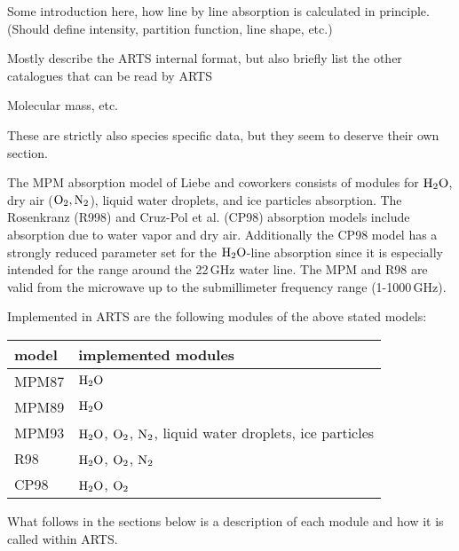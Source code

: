 Some introduction here, how line by line absorption is calculated in
principle. (Should define intensity, partition function, line shape, etc.)


Mostly describe the ARTS internal format, but also briefly list the
other catalogues that can be read by ARTS


Molecular mass, etc. 


These are strictly also species specific data, but they seem to deserve
their own section.



%
%
%
%
\label{levelb:CompAbsMod}
%
The MPM absorption model of Liebe and coworkers consists of modules for 
$\mbox{H}_2\mbox{O}$, dry air ($\mbox{O}_2, \mbox{N}_2$), liquid water droplets, and ice particles 
absorption. The Rosenkranz (R998) and Cruz-Pol et al. (CP98) absorption 
models include absorption due to water vapor and dry air. Additionally 
the CP98 model has a strongly reduced parameter set for the $\mbox{H}_2\mbox{O}$-line 
absorption since it is especially intended for the range around the 
22\,GHz water line. The MPM and R98 are valid from the microwave 
up to the submillimeter frequency range (1-1000\,GHz).

Implemented in ARTS are the following modules of the above stated models:
%
\begin{center}
\begin{tabular}{ll}
\hline
model & implemented modules \\
\hline
MPM87 & $\mbox{H}_2\mbox{O}$ \\
MPM89 & $\mbox{H}_2\mbox{O}$ \\
MPM93 & $\mbox{H}_2\mbox{O}$, $\mbox{O}_2$, $\mbox{N}_2$, liquid water droplets, ice particles \\
R98   & $\mbox{H}_2\mbox{O}$, $\mbox{O}_2$, $\mbox{N}_2$ \\
CP98  & $\mbox{H}_2\mbox{O}$, $\mbox{O}_2$ \\
\hline
\end{tabular}
\end{center}
%
What follows in the sections below is a description of each module and how it is 
called within ARTS.

